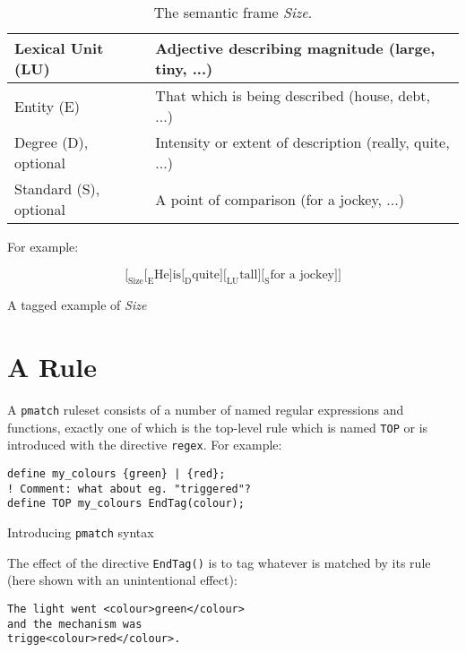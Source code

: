 \documentclass[11pt]{article}
\begin{document}
  \begin{center}
\begin{table}[h]
  \begin{tabular}{ | l | p{4cm} |}
\hline
Lexical Unit (LU) & Adjective describing magnitude (large, tiny, ...) \\
\hline
Entity (E) & That which is being described (house, debt, ...) \\
\hline
Degree (D), optional & Intensity or extent of description
(really, quite, ...) \\
\hline
Standard (S), optional & A point of comparison (for a jockey, ...) \\
\hline
    \end{tabular}
    \caption{The semantic frame \emph{Size}.}
\end{table}
      \end{center}

For example:

\begin{table}[h]
$$
\Big[_\text{Size}\Big[_\text{E}\text{He} \Big]
  \text{is} \Big[_\text{D} \text{quite} \Big] \Big[_\text{LU}\text{tall} \Big]
  \Big[_\text{S} \text{for a jockey} \Big] \Big]
$$
\caption{A tagged example of \emph{Size}}
\end{table}

\section{A Rule}

A \verb+pmatch+ ruleset consists of a number of named regular expressions and
functions, exactly one of which is the top-level rule which is named \verb+TOP+
or is introduced with the directive \verb+regex+. For example:

\begin{table}[h]
\small
\begin{framed}
\begin{verbatim}
define my_colours {green} | {red};
! Comment: what about eg. "triggered"?
define TOP my_colours EndTag(colour);
\end{verbatim}
\end{framed}
\normalsize
\caption{Introducing \texttt{pmatch} syntax}
\end{table}

The effect of the directive \verb+EndTag()+ is to tag whatever is matched by its
rule (here shown with an unintentional effect):

  \small
  \begin{framed}
\begin{verbatim}
The light went <colour>green</colour>
and the mechanism was
trigge<colour>red</colour>.
\end{verbatim}
\end{framed}
  \normalsize
\end{document}
